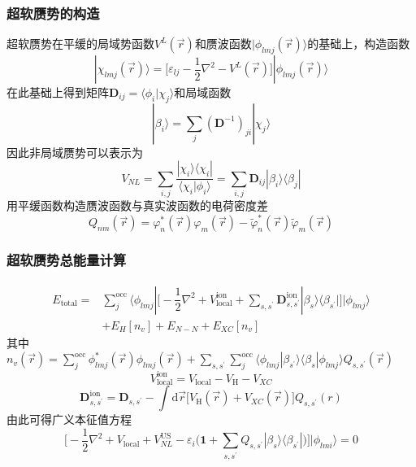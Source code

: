 \documentclass[cjk,slidestop,compress,mathserif,blue]{beamer}
\begin{document}
\frame
{
\frametitle{超软赝势的构造}
超软赝势在平缓的局域势函数$V^L(\vec r)$和赝波函数$|\phi_{lmj}(\vec r)\rangle$的基础上，构造函数
\begin{displaymath}
	|\chi_{lmj}(\vec r)\rangle=\bigg[\varepsilon_{lj}-\dfrac12\nabla^2-V^L(\vec r)\bigg]|\phi_{lmj}(\vec r)\rangle
\end{displaymath}
在此基础上得到矩阵$\mathbf{D}_{ij}=\langle\phi_i|\chi_j\rangle$和局域函数
\begin{displaymath}
	|\beta_i\rangle=\sum_j(\mathbf{D}^{-1})_{ji}|\chi_{j}\rangle
\end{displaymath}
因此非局域赝势可以表示为
\begin{displaymath}
	V_{NL}=\sum_{i,j}\dfrac{|\chi_i\rangle\langle\chi_i|}{\langle\chi_i|\phi_i\rangle}=\sum_{i,j}\mathbf{D}_{ij}|\beta_i\rangle\langle\beta_j|
\end{displaymath}
用平缓函数构造赝波函数与真实波函数的电荷密度差
\begin{displaymath}
	Q_{nm}(\vec r)=\varphi_n^{\ast}(\vec r)\varphi_m(\vec r)-\tilde\varphi_n^{\ast}(\vec r)\tilde\varphi_m(\vec r)
\end{displaymath}
}

\frame
{
	\frametitle{超软赝势总能量计算}
	\begin{displaymath}
		\begin{aligned}
			E_{\mathrm{total}}=&\sum_j^{\mathrm{occ}}\langle\phi_{lmj}|\bigg[-\dfrac12\nabla^2+V_{\mathrm{local}}^{\mathrm{ion}}+\sum_{s,s^{\prime}}\mathbf{D}_{s,s^{\prime}}^{\mathrm{ion}}|\beta_s\rangle\langle\beta_{s^{\prime}}|\bigg]|\phi_{lmj}\rangle\\
			&+E_{H}[n_v]+E_{N-N}+E_{XC}[n_v]
		\end{aligned}
	\end{displaymath}
	其中$n_v(\vec r)=\sum\limits_j^{\mathrm{occ}}\phi_{lmj}^{\ast}(\vec r)\phi_{lmj}(\vec r)+\sum\limits_{s,s^{\prime}}\sum\limits_j^{\mathrm{occ}}\langle\phi_{lmj}|\beta_{s^{\prime}}\rangle\langle\beta_s|\phi_{lmj}\rangle Q_{s,s^{\prime}}(\vec r)$
	$$V_{\mathrm{local}}^{\mathrm{ion}}=V_{\mathrm{local}}-V_{\mathrm H}-V_{XC}$$
	$$\mathbf{D}_{s,s^{\prime}}^{\mathrm{ion}}=\mathbf{D}_{s,s^{\prime}}-\int\mathrm{d}\vec r\big[V_{\mathrm{H}}(\vec r)+V_{XC}(\vec r)\big]Q_{s,s^{\prime}}(r)$$
	由此可得广义本征值方程
	$$\bigg[-\dfrac12\nabla^2+V_{\mathrm{local}}+V_{NL}^{\mathrm{US}}-\varepsilon_i\bigg(\mathbf{1}+\sum_{s,s^{\prime}}Q_{s,s^{\prime}}|\beta_s\rangle\langle\beta_{s^{\prime}}|\bigg)\bigg]|\phi_{lmi}\rangle=0$$
}
\end{document}
